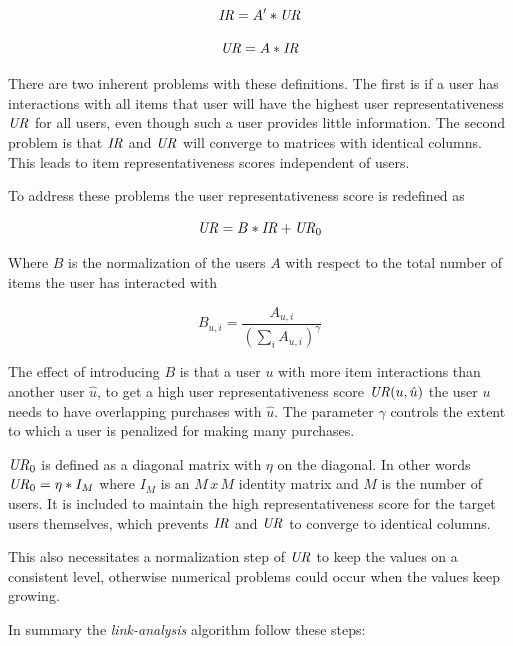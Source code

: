 \begin{equation}
    \mathit{IR} = A' * \mathit{UR}
\end{equation}

\begin{equation}
    \mathit{UR} = A * \mathit{IR}
\end{equation}

There are two inherent problems with these definitions. The first is if a user has interactions with all items that user will have the highest user representativeness $\mathit{UR}$ for all users, even though such a user provides little information. The second problem is that $\mathit{IR}$ and $\mathit{UR}$ will converge to matrices with identical columns. This leads to item representativeness scores independent of users.

To address these problems the user representativeness score is redefined as

\begin{equation}
    \mathit{UR} = B * \mathit{IR} + \mathit{UR}_0
\end{equation}

Where $B$ is the normalization of the users $A$ with respect to the total number of items the user has interacted with

\begin{equation}
    B_{u, i} = \frac{ A_{u, i} }{ \left(\sum_{i} A_{u, i}\right)^\gamma }
\end{equation}

The effect of introducing $B$ is that a user $u$ with more item interactions than another user $\hat{u}$, to get a high user representativeness score $\mathit{UR}(u, \hat{u})$ the user $u$ needs to have overlapping purchases with $\hat{u}$. The parameter $\gamma$ controls the extent to which a user is penalized for making many purchases.

$\mathit{UR}_0$ is defined as a diagonal matrix with $\eta$ on the diagonal. In other words $\mathit{UR}_0 = \eta * I_M$ where $I_M$ is an $M\,x\,M$ identity matrix and $M$ is the number of users. It is included to maintain the high representativeness score for the target users themselves, which prevents $\mathit{IR}$ and $\mathit{UR}$ to converge to identical columns.

This also necessitates a normalization step of $\mathit{UR}$ to keep the values on a consistent level, otherwise numerical problems could occur when the values keep growing.

In summary the \textit{link-analysis} algorithm follow these steps:

